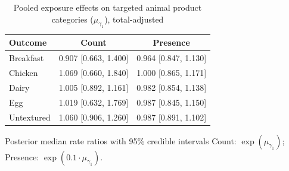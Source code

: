 \begin{table}[H]
\centering
\caption{Pooled exposure effects on targeted animal product categories ($\mu_{\gamma_1}$), total-adjusted}
\label{tab:a2_mu_gamma_adj}
\begin{tabular}{lcc}
\toprule
Outcome & Count & Presence \\
\midrule
Breakfast & 0.907 [0.663, 1.400] & 0.964 [0.847, 1.130] \\
Chicken & 1.069 [0.660, 1.840] & 1.000 [0.865, 1.171] \\
Dairy & 1.005 [0.892, 1.161] & 0.982 [0.854, 1.138] \\
Egg & 1.019 [0.632, 1.769] & 0.987 [0.845, 1.150] \\
Untextured & 1.060 [0.906, 1.260] & 0.987 [0.891, 1.102] \\
\bottomrule
\end{tabular}
\par\smallskip\footnotesize Posterior median rate ratios with 95\% credible intervals Count: $\exp(\mu_{\gamma_1})$; Presence: $\exp(0.1 \cdot \mu_{\gamma_1})$.
\end{table}
